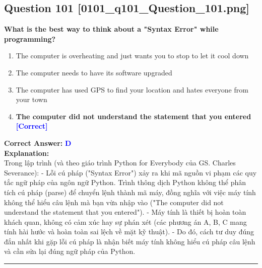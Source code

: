 \documentclass[11pt,a4paper]{article}
\begin{document}
\begin{minipage}{\textwidth}
\subsection*{Question 101 \quad \footnotesize{[0101_q101_Question_101.png]}}
\noindent \textbf{What is the best way to think about a "Syntax Error" while programming?}

\begin{enumerate}[label=\Alph*.]
    \item The computer is overheating and just wants you to stop to let it cool down
    \item The computer needs to have its software upgraded
    \item The computer has used GPS to find your location and hates everyone from your town
    \item \textbf{The computer did not understand the statement that you entered} \hfill \textcolor{blue}{\textbf{[Correct]}}
\end{enumerate}

\noindent \textbf{Correct Answer:} \textcolor{blue}{\textbf{D}} \\[4pt]
\noindent \textbf{Explanation:}\\
Trong lập trình (và theo giáo trình Python for Everybody của GS. Charles Severance):\newline
- Lỗi cú pháp ("Syntax Error") xảy ra khi mã nguồn vi phạm các quy tắc ngữ pháp của ngôn ngữ Python. Trình thông dịch Python không thể phân tích cú pháp (parse) để chuyển lệnh thành mã máy, đồng nghĩa với việc máy tính không thể hiểu câu lệnh mà bạn vừa nhập vào ("The computer did not understand the statement that you entered").\newline
- Máy tính là thiết bị hoàn toàn khách quan, không có cảm xúc hay sự phán xét (các phương án A, B, C mang tính hài hước và hoàn toàn sai lệch về mặt kỹ thuật).\newline
- Do đó, cách tư duy đúng đắn nhất khi gặp lỗi cú pháp là nhận biết máy tính không hiểu cú pháp câu lệnh và cần sửa lại đúng ngữ pháp của Python.
\end{minipage}
\vspace{0.8cm}
\hrule
\vspace{0.5cm}
\end{document}
